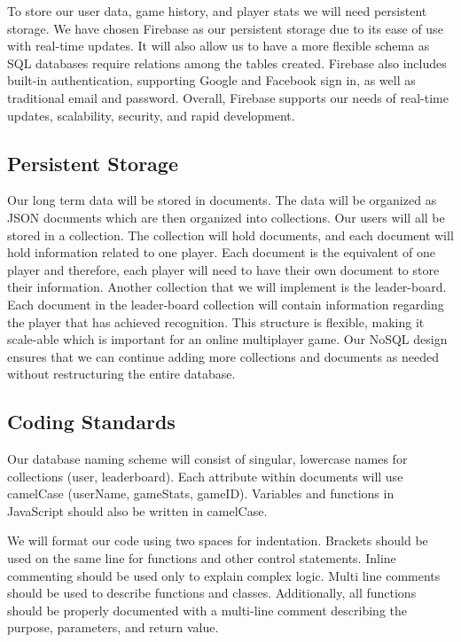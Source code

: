 \documentclass[12pt]{article} %
\begin{document}
To store our user data, game history, and player stats we will need persistent storage. We have chosen Firebase as our persistent storage due to its ease of use with real-time updates. It will also allow us to have a more flexible schema as SQL databases require relations among the tables created. Firebase also includes built-in authentication, supporting Google and Facebook sign in, as well as traditional email and password. Overall, Firebase supports our needs of real-time updates, scalability, security, and rapid development. 

\subsection{Persistent Storage}
Our long term data will be stored in documents. The data will be organized as JSON documents which are then organized into collections. Our users will all be stored in a collection. The collection will hold documents, and each document will hold information related to one player. Each document is the equivalent of one player and therefore, each player will need to have their own document to store their information. Another collection that we will implement is the leader-board. Each document in the leader-board collection will contain information regarding the player that has achieved recognition. This structure is flexible, making it scale-able which is important for an online multiplayer game. Our NoSQL design ensures that we can continue adding more collections and documents as needed without restructuring the entire database.

\subsection{Coding Standards}
Our database naming scheme will consist of singular, lowercase names for collections (user, leaderboard). Each attribute within documents will use camelCase (userName, gameStats, gameID). Variables and functions in JavaScript should also be written in camelCase. 

We will format our code using two spaces for indentation. Brackets should be used on the same line for functions and other control statements. Inline commenting should be used only to explain complex logic. Multi line comments should be used to describe functions and classes. Additionally, all functions should be properly documented with a multi-line comment describing the purpose, parameters, and return value. 
\end{document}
